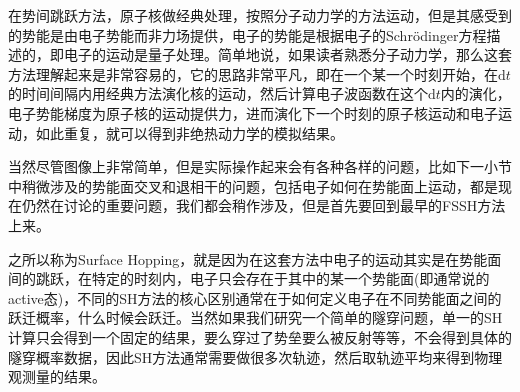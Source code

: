 \documentclass[12pt,a4paper,openany,twoside]{book}
\numberwithin{equation}{section}
\newcommand{\sch}{Schr\"odinger}
\newcommand{\ud}{\mathrm{d}}
\begin{document}
        在势间跳跃方法，原子核做经典处理，按照分子动力学的方法运动，但是其感受到的势能是由电子势能而非力场提供，电子的势能是根据电子的\sch 方程描述的，即电子的运动是量子处理。简单地说，如果读者熟悉分子动力学，那么这套方法理解起来是非常容易的，它的思路非常平凡，即在一个某一个时刻开始，在$\ud t$的时间间隔内用经典方法演化核的运动，然后计算电子波函数在这个$\ud t$内的演化，电子势能梯度为原子核的运动提供力，进而演化下一个时刻的原子核运动和电子运动，如此重复，就可以得到非绝热动力学的模拟结果。

        当然尽管图像上非常简单，但是实际操作起来会有各种各样的问题，比如下一小节中稍微涉及的势能面交叉和退相干的问题，包括电子如何在势能面上运动，都是现在仍然在讨论的重要问题，我们都会稍作涉及，但是首先要回到最早的FSSH方法上来。

        之所以称为Surface Hopping，就是因为在这套方法中电子的运动其实是在势能面间的跳跃，在特定的时刻内，电子只会存在于其中的某一个势能面(即通常说的active态)，不同的SH方法的核心区别通常在于如何定义电子在不同势能面之间的跃迁概率，什么时候会跃迁。当然如果我们研究一个简单的隧穿问题，单一的SH计算只会得到一个固定的结果，要么穿过了势垒要么被反射等等，不会得到具体的隧穿概率数据，因此SH方法通常需要做很多次轨迹，然后取轨迹平均来得到物理观测量的结果。
\end{document}
